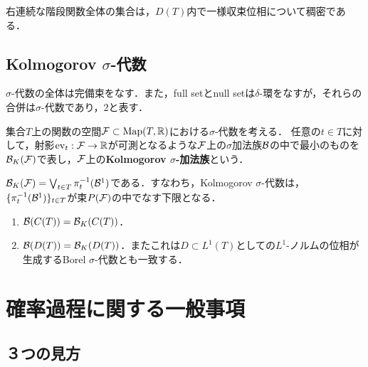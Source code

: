 \documentclass[uplatex,dvipdfmx]{jsreport}
\begin{document}
\begin{proposition}
    右連続な階段関数全体の集合は，$D(T)$内で一様収束位相について稠密である．
\end{proposition}

\subsection{Kolmogorov $\sigma$-代数}

\begin{tcolorbox}[colframe=ForestGreen, colback=ForestGreen!10!white,breakable,colbacktitle=ForestGreen!40!white,coltitle=black,fonttitle=\bfseries\sffamily,
title=]
    $\sigma$-代数の全体は完備束をなす．また，full setとnull setは$\delta$-環をなすが，それらの合併は$\sigma$-代数であり，2と表す\cite{伊藤清確率論}．
\end{tcolorbox}

\begin{definition}
    集合$T$上の関数の空間$\mathcal{F}\subset\mathrm{Map}(T,\mathbb{R})$における$\sigma$-代数を考える．
    任意の$t\in T$に対して，射影$\mathrm{ev}_t:\mathcal{F}\to\mathbb{R}$が可測となるような$\mathcal{F}$上の$\sigma$加法族$\mathcal{B}$の中で最小のものを$\mathcal{B}_K(\mathcal{F})$で表し，$\mathcal{F}$上の\textbf{Kolmogorov $\sigma$-加法族}という．
\end{definition}

\begin{lemma}
    $\mathcal{B}_K(\mathcal{F})=\bigvee_{t\in T}\pi^{-1}_t(\mathcal{B}^1)$である．すなわち，Kolmogorov $\sigma$-代数は，$\{\pi^{-1}_t(\mathcal{B}^1)\}_{t\in T}$が束$P(\mathcal{F})$の中でなす下限となる．
\end{lemma}

\begin{theorem}\mbox{}
    \begin{enumerate}
        \item $\mathcal{B}(C(T))=\mathcal{B}_K(C(T))$．
        \item $\mathcal{B}(D(T))=\mathcal{B}_K(D(T))$．またこれは$D\subset L^1(T)$としての$L^1$-ノルムの位相が生成するBorel $\sigma$-代数とも一致する．
    \end{enumerate}
\end{theorem}

\section{確率過程に関する一般事項}

\subsection{３つの見方}
\end{document}

